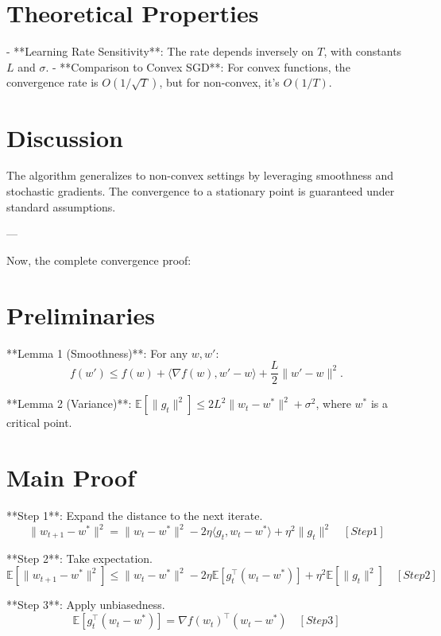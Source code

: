 \section*{Theoretical Properties}

- **Learning Rate Sensitivity**: The rate depends inversely on \( T \), with constants \( L \) and \( \sigma \).
- **Comparison to Convex SGD**: For convex functions, the convergence rate is \( O(1/\sqrt{T}) \), but for non-convex, it's \( O(1/T) \).

\section*{Discussion}

The algorithm generalizes to non-convex settings by leveraging smoothness and stochastic gradients. The convergence to a stationary point is guaranteed under standard assumptions.

---

Now, the complete convergence proof:

\section*{Preliminaries}

**Lemma 1 (Smoothness)**: For any \( w, w' \):
\[
f(w') \leq f(w) + \langle \nabla f(w), w' - w \rangle + \frac{L}{2} \|w' - w\|^2.
\]

**Lemma 2 (Variance)**: \( \mathbb{E}[\|g_t\|^2] \leq 2L^2 \|w_t - w^*\|^2 + \sigma^2 \), where \( w^* \) is a critical point.

\section*{Main Proof}

**Step 1**: Expand the distance to the next iterate.
\[
\|w_{t+1} - w^*\|^2 = \|w_t - w^*\|^2 - 2\eta \langle g_t, w_t - w^* \rangle + \eta^2 \|g_t\|^2 \quad [Step 1]
\]

**Step 2**: Take expectation.
\[
\mathbb{E}[\|w_{t+1} - w^*\|^2] \leq \|w_t - w^*\|^2 - 2\eta \mathbb{E}[g_t^\top (w_t - w^*)] + \eta^2 \mathbb{E}[\|g_t\|^2] \quad [Step 2]
\]

**Step 3**: Apply unbiasedness.
\[
\mathbb{E}[g_t^\top (w_t - w^*)] = \nabla f(w_t)^\top (w_t - w^*) \quad [Step 3]
\]

